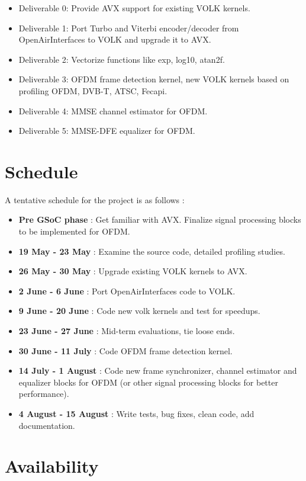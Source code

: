 \documentclass[a4paper,12pt,oneside]{article}
\begin{document}
\begin{itemize}
\item Deliverable 0: Provide AVX support for existing VOLK kernels.
\item Deliverable 1: Port Turbo and Viterbi encoder/decoder from OpenAirInterfaces to VOLK and upgrade it to AVX.
\item Deliverable 2: Vectorize functions like exp, log10, atan2f.
\item Deliverable 3: OFDM frame detection kernel, new VOLK kernels based on profiling OFDM, DVB-T, ATSC, Fecapi.
\item Deliverable 4: MMSE channel estimator for OFDM.
\item Deliverable 5: MMSE-DFE equalizer for OFDM.
\end{itemize}

\section{Schedule}
A tentative schedule for the project is as follows : 
\begin{itemize}
\item \textbf{Pre GSoC phase} : Get familiar with AVX. Finalize signal processing blocks to be implemented for OFDM.  
\item \textbf{19 May - 23 May} : Examine the source code, detailed profiling studies.
\item \textbf{26 May - 30 May} : Upgrade existing VOLK kernels to AVX.
\item \textbf{2 June - 6 June} : Port OpenAirInterfaces code to VOLK.
\item \textbf{9 June - 20 June} : Code new volk kernels and test for speedups.
\item \textbf{23 June - 27 June} : Mid-term evaluations, tie loose ends.
\item \textbf{30 June - 11 July} : Code OFDM frame detection kernel.
\item \textbf{14 July - 1 August} : Code new frame synchronizer, channel estimator and equalizer blocks for OFDM (or other signal processing blocks for better performance).
\item \textbf{4 August - 15 August} : Write tests, bug fixes, clean code, add documentation.
\end{itemize}

\section{Availability}
\end{document}

